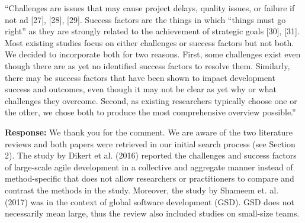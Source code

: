 \documentclass[a4paper,twoside,11pt]{reviewresponse}
\begin{document}
``Challenges are issues that may cause project delays, quality issues, or failure if not ad   [27], [28], [29]. Success factors are the things in which ``things must go right'' as they are strongly related to the achievement of strategic goals [30], [31]. Most existing studies focus on either challenges or success factors but not both. We decided to incorporate both for two reasons. First, some challenges exist even though there are as yet no identified success factors to resolve them. Similarly, there may be success factors that have been shown to impact development success and outcomes, even though it may not be clear as yet why or what challenges they overcome. Second, as existing researchers typically choose one or the other, we chose both to produce the most comprehensive overview possible.''

\textbf{Response:}
We thank you for the comment. We are aware of the two literature reviews and both papers were retrieved in our initial search process (see Section 2). The study by Dikert et al. (2016) reported the challenges and success factors of large-scale agile development in a collective and aggregate manner instead of method-specific that does not allow researchers or practitioners to compare and contrast the methods in the study. Moreover, the study by Shameem et. al. (2017) was in the context of global software development (GSD). GSD does not necessarily mean large, thus the review also included studies on small-size teams.
\end{document}
